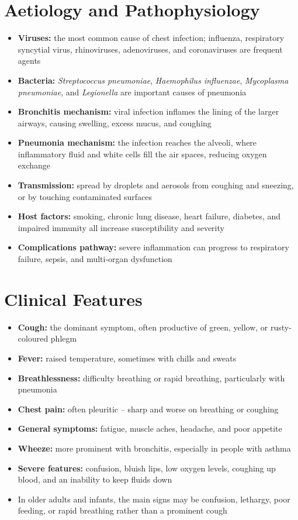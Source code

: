 \section*{Aetiology and Pathophysiology}
\begin{itemize}
    \item \textbf{Viruses:} the most common cause of chest infection; influenza, respiratory syncytial virus, rhinoviruses, adenoviruses, and coronaviruses are frequent agents
    \item \textbf{Bacteria:} \textit{Streptococcus pneumoniae}, \textit{Haemophilus influenzae}, \textit{Mycoplasma pneumoniae}, and \textit{Legionella} are important causes of pneumonia
    \item \textbf{Bronchitis mechanism:} viral infection inflames the lining of the larger airways, causing swelling, excess mucus, and coughing
    \item \textbf{Pneumonia mechanism:} the infection reaches the alveoli, where inflammatory fluid and white cells fill the air spaces, reducing oxygen exchange
    \item \textbf{Transmission:} spread by droplets and aerosols from coughing and sneezing, or by touching contaminated surfaces
    \item \textbf{Host factors:} smoking, chronic lung disease, heart failure, diabetes, and impaired immunity all increase susceptibility and severity
    \item \textbf{Complications pathway:} severe inflammation can progress to respiratory failure, sepsis, and multi-organ dysfunction
\end{itemize}

\section*{Clinical Features}
\begin{itemize}
    \item \textbf{Cough:} the dominant symptom, often productive of green, yellow, or rusty-coloured phlegm
    \item \textbf{Fever:} raised temperature, sometimes with chills and sweats
    \item \textbf{Breathlessness:} difficulty breathing or rapid breathing, particularly with pneumonia
    \item \textbf{Chest pain:} often pleuritic -- sharp and worse on breathing or coughing
    \item \textbf{General symptoms:} fatigue, muscle aches, headache, and poor appetite
    \item \textbf{Wheeze:} more prominent with bronchitis, especially in people with asthma
    \item \textbf{Severe features:} confusion, bluish lips, low oxygen levels, coughing up blood, and an inability to keep fluids down
    \item In older adults and infants, the main signs may be confusion, lethargy, poor feeding, or rapid breathing rather than a prominent cough
\end{itemize}

